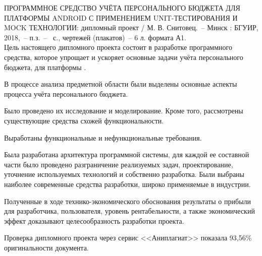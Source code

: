 \thispagestyle{empty}


\MakeUppercase{Программное средство учёта персонального бюджета для платформы Android с применением Unit-\-тес\-ти\-ро\-ва\-ния и Mock технологии}: дипломный проект / М. В. Снитовец.~-- Минск : БГУИР, 2018,~-- п.з.~-- \totalpages~с., чертежей (плакатов)~-- 6 л. формата А1.
\\

Цель настоящего дипломного проекта состоит в  разработке программного средства, которое упрощает и ускоряет основные задачи учёта персонального бюджета, для платформы \andro.

В процессе анализа предметной области были выделены основные аспекты процесса учёта персонального бюджета.

Было проведено их исследование и моделирование.
Кроме того, рассмотрены существующие средства схожей функциональности.

Выработаны функциональные и нефункциональные требования.

Была разработана архитектура программной системы, для каждой ее составной части было проведено разграничение реализуемых задач, проектирование, уточнение используемых технологий и собственно разработка.
Были выбраны наиболее современные средства разработки, широко применяемые в индустрии.

Полученные в ходе технико-экономического обоснования результаты о прибыли для разработчика, пользователя, уровень рентабельности, а также экономический эффект доказывают целесообразность разработки про\-екта.

Проверка дипломного проекта через сервис <<Аниплагиат>> показала 93,56\% оригинальности документа.